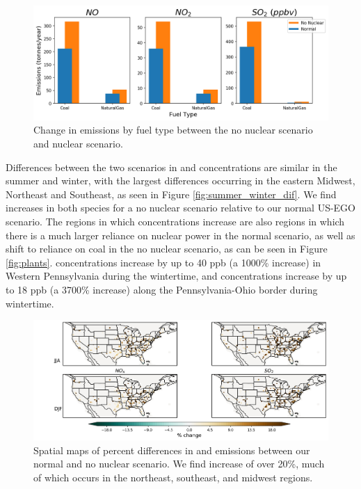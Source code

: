 \documentclass[12]{article}
\begin{document}
\begin{figure}[!htbp]
    \centering
    \includegraphics[scale=0.6]{ego_nonuclear_project/Figures/emissions_fueltype.png}
    \caption{Change in emissions by fuel type between the no nuclear scenario and nuclear scenario.} 
    \label{fig:emissions_comp}
\end{figure}



Differences between the two scenarios in  and  concentrations are similar in the summer and winter, with the largest differences occurring in the eastern Midwest, Northeast and Southeast, as seen in Figure \ref{fig:summer_winter_dif}. We find increases in both species for a no nuclear scenario relative to our normal US-EGO scenario. The regions in which concentrations increase are also regions in which there is a much larger reliance on nuclear power in the normal scenario, as well as shift to reliance on coal in the no nuclear scenario, as can be seen in Figure \ref{fig:plants}.  concentrations increase by up to 40 ppb (a 1000\% increase) in Western Pennsylvania during the wintertime, and  concentrations increase by up to 18 ppb (a 3700\% increase) along the Pennsylvania-Ohio border during wintertime. 

\begin{figure}[!htbp]
    \centering
    \includegraphics[width=1.01\textwidth]{ego_nonuclear_project/Figures/nox_so2_emissions.png}
    \caption{Spatial maps of percent differences in  and  emissions between our normal and no nuclear scenario. We find increase of over 20\%, much of which occurs in the northeast, southeast, and midwest regions.} 
    \label{fig:emissions_nonuc}
\end{figure}
\end{document}
